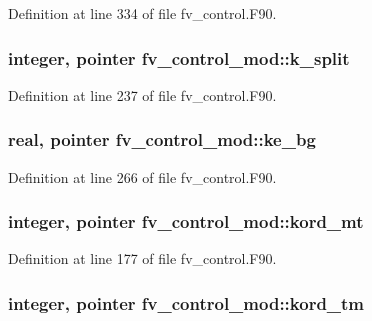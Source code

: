 Definition at line 334 of file fv\-\_\-control.\-F90.

\subsubsection[{k\-\_\-split}]{\setlength{\rightskip}{0pt plus 5cm}integer, pointer fv\-\_\-control\-\_\-mod\-::k\-\_\-split\hspace{0.3cm}{\ttfamily [private]}}\label{classfv__control__mod_a79e7bc857b0773099d50877366fb9289}


Definition at line 237 of file fv\-\_\-control.\-F90.

\subsubsection[{ke\-\_\-bg}]{\setlength{\rightskip}{0pt plus 5cm}real, pointer fv\-\_\-control\-\_\-mod\-::ke\-\_\-bg\hspace{0.3cm}{\ttfamily [private]}}\label{classfv__control__mod_aa12a6f639924bcce16aea92d92725f17}


Definition at line 266 of file fv\-\_\-control.\-F90.

\subsubsection[{kord\-\_\-mt}]{\setlength{\rightskip}{0pt plus 5cm}integer, pointer fv\-\_\-control\-\_\-mod\-::kord\-\_\-mt\hspace{0.3cm}{\ttfamily [private]}}\label{classfv__control__mod_a72331132938fe4e15a1476ea5e86c590}


Definition at line 177 of file fv\-\_\-control.\-F90.

\subsubsection[{kord\-\_\-tm}]{\setlength{\rightskip}{0pt plus 5cm}integer, pointer fv\-\_\-control\-\_\-mod\-::kord\-\_\-tm\hspace{0.3cm}{\ttfamily [private]}}\label{classfv__control__mod_a36c2bfe007d2c6556cf6908901a9c781}


